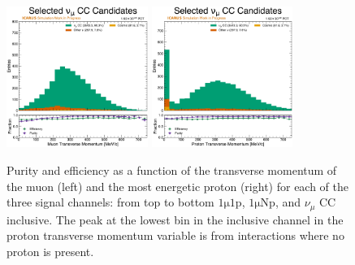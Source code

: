 \begin{figure}[!htb]
    \\
    \includegraphics[width=0.41\textwidth]{figures/neutrino_selection/selected_hist1d_1muX_muon_pt.pdf}
    \includegraphics[width=0.41\textwidth]{figures/neutrino_selection/selected_hist1d_1muX_proton_pt.pdf}
    \caption{Purity and efficiency as a function of the transverse momentum of the muon (left) and the most energetic proton (right) for each of the three signal channels: from top to bottom $\mathrm{1\mu 1p}$, $\mathrm{1\mu Np}$, and $\nu_\mu$ CC inclusive. The peak at the lowest bin in the inclusive channel in the proton transverse momentum variable is from interactions where no proton is present.}
    \label{fig:pureff_muon_proton_pt}
\end{figure}

